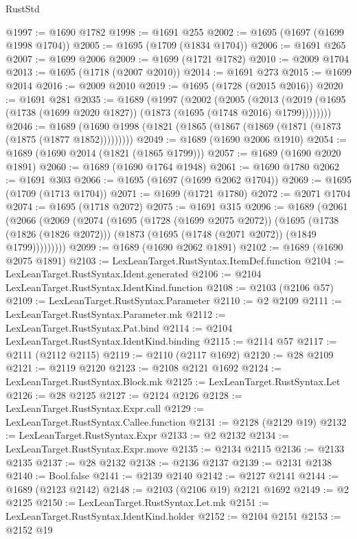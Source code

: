 \begin{lexlean}{RustStd}
\begin{coremodule}
{\begin{coremodule}
{{{{{{{{{{{{{{{{@1997 := @1690 @1782
@1998 := @1691 @255
@2002 := @1695 (@1697 (@1699 @1998 @1704))
@2005 := @1695 (@1709 (@1834 @1704))
@2006 := @1691 @265
@2007 := @1699 @2006
@2009 := @1699 (@1721 @1782)
@2010 := @2009 @1704
@2013 := @1695 (@1718 (@2007 @2010))
@2014 := @1691 @273
@2015 := @1699 @2014
@2016 := @2009 @2010
@2019 := @1695 (@1728 (@2015 @2016))
@2020 := @1691 @281
@2035 := @1689
    (@1997
      (@2002
        (@2005
          (@2013 (@2019 (@1695 (@1738 (@1699 @2020 @1827)) (@1873 (@1695 (@1748 @2016) @1799))))))))
@2046 := @1689 (@1690 @1998 (@1821 (@1865 (@1867 (@1869 (@1871 (@1873 (@1875 (@1877 @1852)))))))))
@2049 := @1689 (@1690 @2006 @1910)
@2054 := @1689 (@1690 @2014 (@1821 (@1865 @1799)))
@2057 := @1689 (@1690 @2020 @1891)
@2060 := @1689 (@1690 @1764 @1948)
@2061 := @1690 @1780
@2062 := @1691 @303
@2066 := @1695 (@1697 (@1699 @2062 @1704))
@2069 := @1695 (@1709 (@1713 @1704))
@2071 := @1699 (@1721 @1780)
@2072 := @2071 @1704
@2074 := @1695 (@1718 @2072)
@2075 := @1691 @315
@2096 := @1689
    (@2061
      (@2066
        (@2069
          (@2074
            (@1695
              (@1728 (@1699 @2075 @2072))
              (@1695
                (@1738 (@1826 (@1826 @2072)))
                (@1873 (@1695 (@1748 (@2071 @2072)) (@1849 @1799)))))))))
@2099 := @1689 (@1690 @2062 @1891)
@2102 := @1689 (@1690 @2075 @1891)
@2103 := LexLeanTarget.RustSyntax.ItemDef.function
@2104 := LexLeanTarget.RustSyntax.Ident.generated
@2106 := @2104 LexLeanTarget.RustSyntax.IdentKind.function
@2108 := @2103 (@2106 @57)
@2109 := LexLeanTarget.RustSyntax.Parameter
@2110 := @2 @2109
@2111 := LexLeanTarget.RustSyntax.Parameter.mk
@2112 := LexLeanTarget.RustSyntax.Pat.bind
@2114 := @2104 LexLeanTarget.RustSyntax.IdentKind.binding
@2115 := @2114 @57
@2117 := @2111 (@2112 @2115)
@2119 := @2110 (@2117 @1692)
@2120 := @28 @2109
@2121 := @2119 @2120
@2123 := @2108 @2121 @1692
@2124 := LexLeanTarget.RustSyntax.Block.mk
@2125 := LexLeanTarget.RustSyntax.Let
@2126 := @28 @2125
@2127 := @2124 @2126
@2128 := LexLeanTarget.RustSyntax.Expr.call
@2129 := LexLeanTarget.RustSyntax.Callee.function
@2131 := @2128 (@2129 @19)
@2132 := LexLeanTarget.RustSyntax.Expr
@2133 := @2 @2132
@2134 := LexLeanTarget.RustSyntax.Expr.move
@2135 := @2134 @2115
@2136 := @2133 @2135
@2137 := @28 @2132
@2138 := @2136 @2137
@2139 := @2131 @2138
@2140 := Bool.false
@2141 := @2139 @2140
@2142 := @2127 @2141
@2144 := @1689 (@2123 @2142)
@2148 := @2103 (@2106 @19) @2121 @1692
@2149 := @2 @2125
@2150 := LexLeanTarget.RustSyntax.Let.mk
@2151 := LexLeanTarget.RustSyntax.IdentKind.holder
@2152 := @2104 @2151
@2153 := @2152 @19
}}}}}}}}}}}}}}}}
\end{coremodule}}
\end{coremodule}
\end{lexlean}
